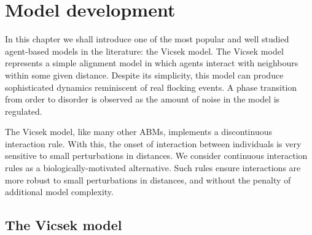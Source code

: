 \graphicspath{{fig/model_development/}}

\chapter{Model development}
\label{cha:model_dev}

In this chapter we shall introduce one of the most popular and well studied
agent-based models in the literature: the Vicsek model. The Vicsek model
represents a simple alignment model in which agents interact with neighbours
within some given distance. Despite its simplicity, this model can produce
sophisticated dynamics reminiscent of real flocking events. A phase transition
from order to disorder is observed as the amount of noise in the model is
regulated.

The Vicsek model, like many other ABMs, implements a discontinuous interaction
rule. With this, the onset of interaction between individuals is very sensitive
to small perturbations in distances. We consider continuous interaction rules
as a biologically-motivated alternative. Such rules ensure interactions are
more robust to small perturbations in distances, and without the penalty of
additional model complexity.

\section{The Vicsek model}

